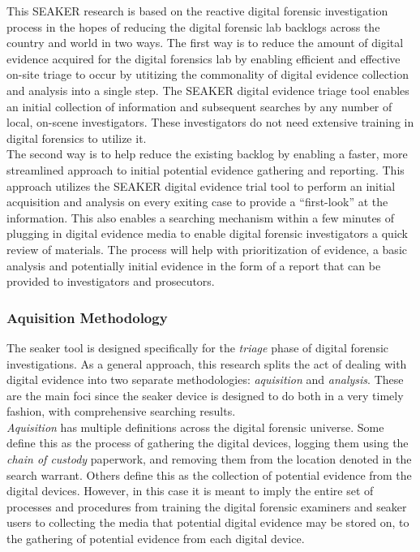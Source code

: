 \documentclass[12pt]{article}
\begin{document}
This SEAKER research is based on the reactive digital forensic investigation process in the hopes of reducing the digital
forensic lab backlogs across the country and world in two ways.  The first way is to reduce the amount of digital
evidence acquired for the digital forensics lab by enabling efficient and effective on-site triage to occur by
utitizing the commonality of digital evidence collection and analysis into a single step.  The SEAKER digital
evidence triage tool enables an initial collection of information and subsequent searches by any number of local,
on-scene investigators.  These investigators do not need extensive training in digital forensics to utilize it.\\

The second way is to help reduce the existing backlog by enabling a faster, more streamlined approach to initial
potential evidence gathering and reporting.  This approach utilizes the SEAKER digital evidence trial tool to 
perform an initial acquisition and analysis on every exiting case to provide a ``first-look'' at the information.  This
also enables a searching mechanism within a few minutes of plugging in digital evidence media to enable digital 
forensic investigators a quick review of materials.  The process will help with prioritization of evidence, a basic
analysis and potentially initial evidence in the form of a report that can be provided to investigators and
prosecutors.\\

\subsubsection{Aquisition Methodology}

The \gls{seaker} tool is designed specifically for the {\em triage} phase of digital forensic
investigations.  As a general approach, this research splits the act of dealing with digital evidence into two
separate methodologies: {\em aquisition} and {\em analysis}.  These are the main foci since the \gls{seaker}
device is designed to do both in a very timely fashion, with comprehensive searching results.\\

{\em Aquisition} has multiple definitions across the digital forensic universe.
Some define this as the process of gathering the digital devices, logging them using the 
{\em chain of custody} paperwork, and removing them from the location denoted in the
search warrant.  Others define this as the collection of potential evidence from the digital
devices.  However, in this case it is meant to imply the entire set of processes and
procedures from training the digital forensic examiners and \gls{seaker} users
to collecting the media that potential digital evidence may be stored on, 
to the gathering of potential evidence from each digital device.\\
\end{document}
